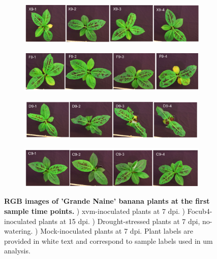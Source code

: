\begin{figure}[ph!]
    \centering
    \begin{subfigure}[b]{\textwidth}
        \includegraphics[width=\textwidth]{Figures/FirstTimePointXanthomonasBLQs.pdf}
        \caption{}
        \label{fig:XvmFirstTimeBLQs}
    \end{subfigure}
     \begin{subfigure}[b]{\textwidth}
        \includegraphics[width=\textwidth]{Figures/FirstTimePointFusariumBLQs.pdf}
        \caption{}
        \label{fig:FocFirstTimeBLQs}
    \end{subfigure}
         \begin{subfigure}[b]{\textwidth}
        \includegraphics[width=\textwidth]{Figures/FirstTimePointDroughtBLQs.pdf}
        \caption{}
        \label{fig:DroFirstTimeBLQs}
    \end{subfigure}
         \begin{subfigure}[b]{\textwidth}
        \includegraphics[width=\textwidth]{Figures/FirstTimePointControlBLQs.pdf}
        \caption{}
        \label{fig:ConFirstTimeBLQs}
    \end{subfigure}
    \caption[RGB images of 'Grande Naine' banana plants at the first sample time points.]{\textbf{RGB images of 'Grande Naine' banana plants at the first sample time points.}
    \textbf{}) \acl{xvm}-inoculated plants at 7 \acl{dpi}.
    \textbf{}) \acl{Focub4}-inoculated plants at 15 \acl{dpi}.
    \textbf{}) Drought-stressed plants at 7 \ac{dpi}, no-watering.
    \textbf{}) Mock-inoculated plants at 7 \ac{dpi}.
    Plant labels are provided in white text and correspond to sample labels used in \acl{um} analysis.
    }
    \label{fig:FirstTimePointSymptoms}
\end{figure}

